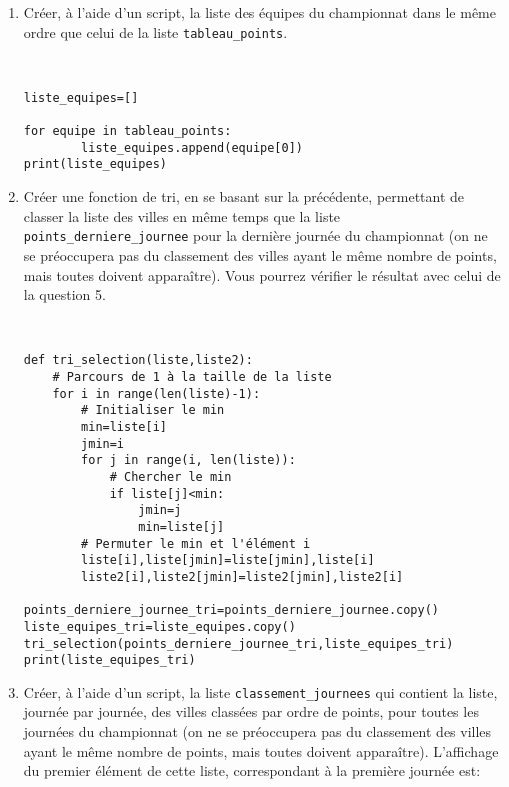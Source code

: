 \begin{enumerate}
\item Créer, à l'aide d'un script, la liste des équipes du championnat dans le même ordre que celui de la liste \verb?tableau_points?.

\begin{solution}~\ \\
\begin{verbatim}
liste_equipes=[]

for equipe in tableau_points:
        liste_equipes.append(equipe[0])
print(liste_equipes)
\end{verbatim}
\end{solution}

\item Créer une fonction de tri, en se basant sur la précédente, permettant de classer la liste des villes en même temps que la liste \verb?points_derniere_journee? pour la dernière journée du championnat (on ne se préoccupera pas du classement des villes ayant le même nombre de points, mais toutes doivent apparaître). Vous pourrez vérifier le résultat avec celui de la question 5.

\begin{solution}~\ \\
\begin{verbatim}
def tri_selection(liste,liste2): 
    # Parcours de 1 à la taille de la liste
    for i in range(len(liste)-1):
        # Initialiser le min
        min=liste[i]
        jmin=i
        for j in range(i, len(liste)):
            # Chercher le min
            if liste[j]<min:
                jmin=j
                min=liste[j]
        # Permuter le min et l'élément i
        liste[i],liste[jmin]=liste[jmin],liste[i]
        liste2[i],liste2[jmin]=liste2[jmin],liste2[i]

points_derniere_journee_tri=points_derniere_journee.copy()
liste_equipes_tri=liste_equipes.copy()
tri_selection(points_derniere_journee_tri,liste_equipes_tri)
print(liste_equipes_tri)
\end{verbatim}
\end{solution}

\item Créer, à l'aide d'un script, la liste \verb?classement_journees? qui contient la liste, journée par journée, des villes classées par ordre de points, pour toutes les journées du championnat (on ne se préoccupera pas du classement des villes ayant le même nombre de points, mais toutes doivent apparaître). L'affichage du premier élément de cette liste, correspondant à la première journée est:


\end{enumerate}
